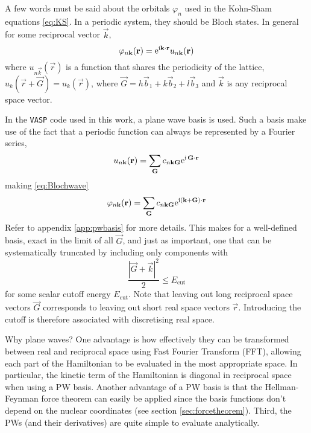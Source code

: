 \documentclass[11pt,bibliography=totoc,index=totoc]{scrbook}   %
\newcommand{\vasp}{{\texttt{VASP}}} %
\begin{document}
A few words must be said about the orbitals $\varphi_n$ used in the Kohn-Sham equations \eqref{eq:KS}.
In a periodic system, they should be Bloch states. In general for some reciprocal vector $\vec{k}$,
\begin{equation}
    \varphi_{n\boldsymbol{\mathrm{k}}}(\boldsymbol{\mathrm{r}}) = \mathrm{e}^{\mathrm{i}\boldsymbol{\mathrm{k}}\cdot\boldsymbol{\mathrm{r}}} u_{n\boldsymbol{\mathrm{k}}}(\boldsymbol{\mathrm{r}})
  \label{eq:Blochwave}
\end{equation}
where $u_{n\vec{k}}(\vec{r})$ is a function that shares the periodicity of the lattice, $u_k(\vec{r}+\vec{G}) = u_k(\vec{r})$,
where $\vec{G} = h\vec{b}_1 + k\vec{b}_2 + l\vec{b}_3$ and $\vec{k}$ is any reciprocal space vector.

In the {\vasp} code used in this work, a plane wave basis is used.
Such a basis make use of the fact that a periodic function can always be represented by a Fourier series, 
\begin{equation}
    u_{n\boldsymbol{\mathrm{k}}}(\boldsymbol{\mathrm{r}}) = \sum_{\boldsymbol{\mathrm{G}}} c_{n\boldsymbol{\mathrm{k}}\boldsymbol{\mathrm{G}}} \mathrm{e}^{\mathrm{i}\,\boldsymbol{\mathrm{G}}\cdot\boldsymbol{\mathrm{r}}}
\end{equation}
making \eqref{eq:Blochwave}
\begin{equation}
    \varphi_{n\boldsymbol{\mathrm{k}}}(\boldsymbol{\mathrm{r}}) = \sum_{\boldsymbol{\mathrm{G}}} c_{n\boldsymbol{\mathrm{k}}\boldsymbol{\mathrm{G}}} \mathrm{e}^{\mathrm{i}(\boldsymbol{\mathrm{k}}+\boldsymbol{\mathrm{G}})\cdot\boldsymbol{\mathrm{r}}}
  \label{eq:pwbasis}
\end{equation}
Refer to appendix \ref{app:pwbasis} for more details.
This makes for a well-defined basis, exact in the limit of all $\vec{G}$, and just as important, 
one that can be systematically truncated by including only components with 
\begin{equation}
  \frac{|\vec{G}+\vec{k}|^2}{2} \leq E_{\text{cut}}
\end{equation}
for some scalar cutoff energy $E_{\text{cut}}$. 
Note that leaving out long reciprocal space vectors $\vec{G}$ corresponds to leaving out short real space vectors $\vec{r}$. 
Introducing the cutoff is therefore associated with discretising real space.

Why plane waves?
One advantage is how effectively they can be transformed between real and reciprocal space using Fast Fourier Transform (FFT),
allowing each part of the Hamiltonian to be evaluated in the most appropriate space.
In particular, the kinetic term of the Hamiltonian is diagonal in reciprocal space when using a PW basis.
Another advantage of a PW basis is that the Hellman-Feynman force theorem can easily be applied since the basis functions don't depend on the nuclear coordinates (see section \ref{sec:forcetheorem}). 
Third, the PWs (and their derivatives) are quite simple to evaluate analytically.\cite[187]{Kohanoff:2006}
\end{document}
